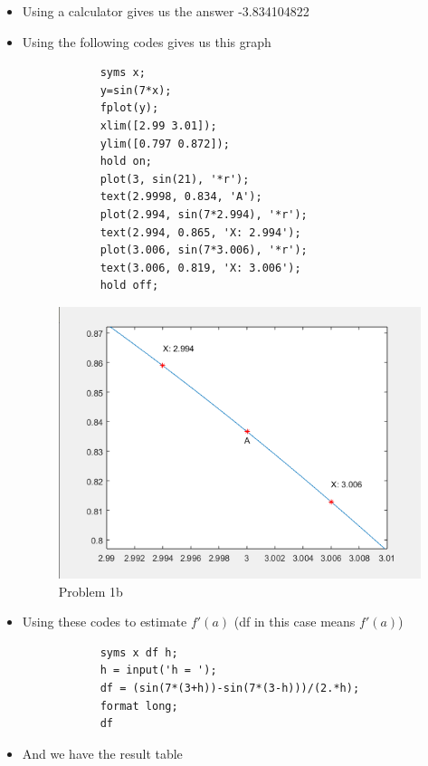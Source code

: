 \documentclass[12pt,en,a4paper]{article}
\begin{document}
	\begin{itemize}
		\item Using a calculator gives us the answer -3.834104822
		\item Using the following codes gives us this graph\\
		\begin{mdframed}[hidealllines=true,backgroundcolor=magenta!10]
			\begin{lstlisting}
			syms x;
			y=sin(7*x);
			fplot(y);
			xlim([2.99 3.01]);
			ylim([0.797 0.872]);
			hold on;
			plot(3, sin(21), '*r');
			text(2.9998, 0.834, 'A');
			plot(2.994, sin(7*2.994), '*r');
			text(2.994, 0.865, 'X: 2.994');
			plot(3.006, sin(7*3.006), '*r');
			text(3.006, 0.819, 'X: 3.006');
			hold off;
			\end{lstlisting}
		\end{mdframed}
		\begin{figure}[h]
			\centering
			\includegraphics[scale=0.5]{1b.png}
			\caption*{Problem 1b}
			\label{prob1b}
		\end{figure}
		\item Using these codes to estimate \(f'(a)\) (df in this case means \(f'(a)\))\\
		\begin{mdframed}[hidealllines=true,backgroundcolor=magenta!10]
			\begin{lstlisting}
			syms x df h;
			h = input('h = ');
			df = (sin(7*(3+h))-sin(7*(3-h)))/(2.*h);
			format long;
			df
			\end{lstlisting}
		\end{mdframed}
		\item And we have the result table

\end{itemize}
\end{document}
